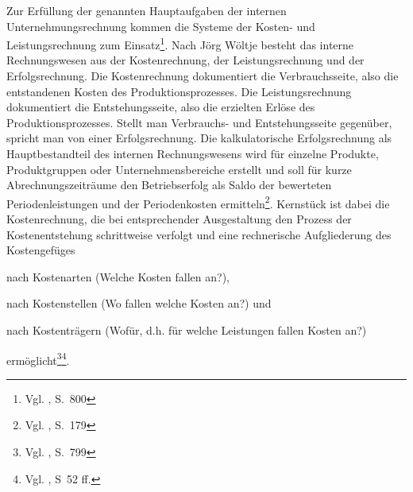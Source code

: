 Zur Erfüllung der genannten Hauptaufgaben der internen Unternehmungsrechnung kommen die Systeme der Kosten- und Leistungsrechnung zum Einsatz\footnote{Vgl. \cite{Schierenbeck2008}, S.~800}. Nach Jörg Wöltje besteht das interne Rechnungswesen aus der Kostenrechnung, der Leistungsrechnung und der Erfolgsrechnung. Die Kostenrechnung dokumentiert die Verbrauchsseite, also die entstandenen Kosten des Produktionsprozesses. Die Leistungsrechnung dokumentiert die Entstehungsseite, also die erzielten Erlöse des Produktionsprozesses. Stellt man Verbrauchs- und Entstehungsseite gegenüber, spricht man von einer Erfolgsrechnung. Die kalkulatorische Erfolgsrechnung als Hauptbestandteil des internen Rechnungswesens wird für einzelne Produkte, Produktgruppen oder Unternehmensbereiche erstellt und soll für kurze Abrechnungszeiträume den Betriebserfolg als Saldo der bewerteten Periodenleistungen und der Periodenkosten ermitteln\footnote{Vgl. \cite{Woltje2008}, S.~179}.
Kernstück ist dabei die Kostenrechnung, die bei entsprechender Ausgestaltung den Prozess der Kostenentstehung schrittweise verfolgt und eine rechnerische Aufgliederung des Kostengefüges 
\begin{compactitem}
\item nach Kostenarten (Welche Kosten fallen an?), 
\item nach Kostenstellen (Wo fallen welche Kosten an?) und 
\item nach Kostenträgern (Wofür, d.h. für welche Leistungen fallen Kosten an?)
\end{compactitem} ermöglicht\footnote{Vgl. \cite{Schierenbeck2008}, S.~799}\footnote{Vgl. \cite{Ossadnik2008}, S~52 ff.}.
%
%

